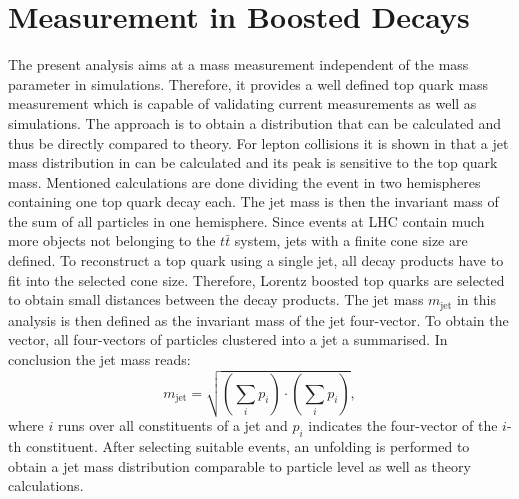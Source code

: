 \section{Measurement in Boosted Decays}
	The present analysis aims at a mass measurement independent of the mass parameter in simulations. Therefore, it provides a well defined top quark mass measurement which is capable of validating current measurements as well as simulations. The approach is to obtain a distribution that can be calculated and thus be directly compared to theory. For lepton collisions it is shown in \cite{eejetmass} that a jet mass distribution in can be calculated and its peak is sensitive to the top quark mass. Mentioned calculations are done dividing the event in two hemispheres containing one top quark decay each. The jet mass is then the invariant mass of the sum of all particles in one hemisphere. Since events at LHC contain much more objects not belonging to the $t\bar{t}$ system, jets with a finite cone size are defined. To reconstruct a top quark using a single jet, all decay products have to fit into the selected cone size. Therefore, Lorentz boosted top quarks are selected to obtain small distances between the decay products. The jet mass $m_\text{jet}$ in this analysis is then defined as the invariant mass of the jet four-vector. To obtain the vector, all four-vectors of particles clustered into a jet a summarised. In conclusion the jet mass reads:
	\begin{equation}
	m_\text{jet} = \sqrt{\left( \sum_{i} p_i \right) \cdot \left( \sum_{i} p_i \right)},
	\end{equation}
	where $i$ runs over all constituents of a jet and $p_i$ indicates the four-vector of the $i$-th constituent. After selecting suitable events, an unfolding is performed to obtain a jet mass distribution comparable to particle level as well as theory calculations. 
	
	


